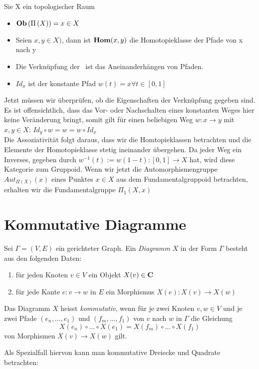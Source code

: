 \documentclass{article}
\renewcommand{\id}{\ensuremath{Id}}
\begin{document}
		\begin{bsp}[Fundamentalgruppoid]
		 	\cite[Aufgabe 2.24 ]{Bra}
		 	Sie X ein topologischer Raum
		\begin{itemize}
			\item \( \mathbf{Ob}  \left( \Pi \left( X \right) \right) = x \in X \)
			\item Seien \( x ,y \in X ) \), dann ist \(  \mathbf{Hom } (x,y) \) die Homotopieklasse der Pfade von x nach y
			\item Die Verkn\"upfung der \Hom \ ist das Aneinanderh\"angen von Pfaden.
			\item \(  \id_x \) ist der konstante Pfad \( w(t)=x \forall t \in [0,1] \)
		\end{itemize}
		Jetzt m\"ussen wir \"uberpr\"ufen, ob die Eigenschaften der Verkn\"upfung gegeben sind.
		Es ist offensichtlich, dass das Vor- oder Nachschalten eines konstanten Weges hier keine Ver\"anderung bringt, somit gilt f\"ur einen beliebigen Weg 
		\(w:x \to y \) mit \( x,y \in X\):
		\( \id_y \circ w = w = w \circ \id_x \) \\
		Die Assoziativit\"at folgt daraus, dass wir die Homtopieklassen betrachten und die Elemente der Homotopieklasse stetig ineinander \"ubergehen.
		Da jeder Weg ein Inverses, gegeben durch \( w^{-1}(t):=w(1-t): [0,1] \to X \) hat, wird diese Kategorie zum Gruppoid.
		Wenn wir jetzt die Automorphismengruppe \( Aut_{\Pi(X)}(x) \) eines Punktes \(x \in X \) aus dem Fundamentalgruppoid betrachten, erhalten wir die Fundamentalgruppe \( \Pi_1(X,x) \) \cite[Beispiel 2.3.14-(8)]{Bra}
		\end{bsp}
	
	\section{Kommutative Diagramme}
		\begin{defi}
		 \cite[Definition 2.4.3]{Bra}
		Sei \( \Gamma =(V,E) \) ein gerichteter Graph. Ein  \emph{Diagramm} $X$ in der Form \( \Gamma \) besteht aus den folgenden Daten:
		\begin{enumerate}
			\item f\"ur jeden Knoten \( v \in V \) ein  Objekt \( X(v) \in \mathbf{C} \)
			\item f\"ur jede Kante \( e:v \to w \) in \( E \) ein Morphismus \( X(e):X(v) \to X(w) \)  
		\end{enumerate}
		Das Diagramm $X$ heisst \emph{kommutativ}, wenn f\"ur je zwei Knoten \(v,w \in V \) und je zwei Pfade \( \left(e_n, \dots ,e_1\right) \) und \( \left(f_m, \dots ,f_1\right) \) von $v $ nach $w$ in $\Gamma $ die Gleichung 
		\[
			X(e_n) \circ \dots \circ X(e_1) = X(f_m) \circ \dots \circ X(f_1)
		\]
		von Morphismen \( X(v) \to X(w) \) gilt.
		
		Als Spezialfall hiervon kann man kommutative Dreiecke und Quadrate betrachten:\\
 		 
			
		\end{defi}
			 
\end{document}
